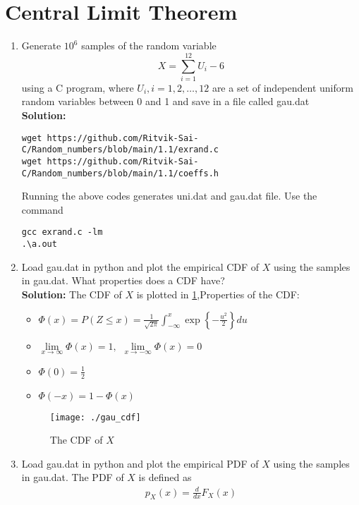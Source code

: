 \documentclass[journal,12pt,twocolumn]{IEEEtran}
\renewcommand\thesection{\arabic{section}}
\theoremstyle{remark}
\newcommand{\solution}{\noindent \textbf{Solution: }}
\numberwithin{equation}{section}
\begin{document}
\section{Central Limit Theorem}
%
\begin{enumerate}[label=\thesection.\arabic*
,ref=\thesection.\theenumi]
%
\item
Generate $10^6$ samples of the random variable
%
\begin{equation}
X = \sum_{i=1}^{12}U_i -6
\end{equation}
%
using a C program, where $U_i, i = 1,2,\dots, 12$ are  a set of independent uniform random variables between 0 and 1
and save in a file called gau.dat
\\
\solution
\begin{lstlisting}
wget https://github.com/Ritvik-Sai-C/Random_numbers/blob/main/1.1/exrand.c
wget https://github.com/Ritvik-Sai-C/Random_numbers/blob/main/1.1/coeffs.h
\end{lstlisting}
Running the above codes generates uni.dat and gau.dat file.
Use the command 
\begin{lstlisting}
gcc exrand.c -lm
.\a.out
\end{lstlisting}
%
\item
Load gau.dat in python and plot the empirical CDF of $X$ using the samples in gau.dat. What properties does a CDF have?
\\
\solution 
The CDF of $X$ is plotted in \ref{fig:gau_cdf},Properties of the CDF:
\begin{itemize}
\item $\Phi(x)=P(Z \leq x)= \frac{1}{\sqrt{2 \pi}} \int_{-\infty}^{x}\exp\left\{-\frac{u^2}{2}\right\} du$
\item $\lim \limits_{x\rightarrow \infty} \Phi(x)=1, \hspace{5pt} \lim \limits_{x\rightarrow -\infty} \Phi(x)=0$
\item  $\Phi(0)=\frac{1}{2}$
\item  $\Phi(-x)=1-\Phi(x)$
\end{itemize}
\begin{figure}[h]
\centering
\texttt{[image: ./gau\_cdf]}
\caption{The CDF of $X$}
\label{fig:gau_cdf}
\end{figure}
\item
Load gau.dat in python and plot the empirical PDF of $X$ using the samples in gau.dat. The PDF of $X$ is defined as
\begin{align}
p_{X}(x) = \frac{d}{dx}F_{X}(x)
\end{align}

\end{enumerate}
\end{document}
